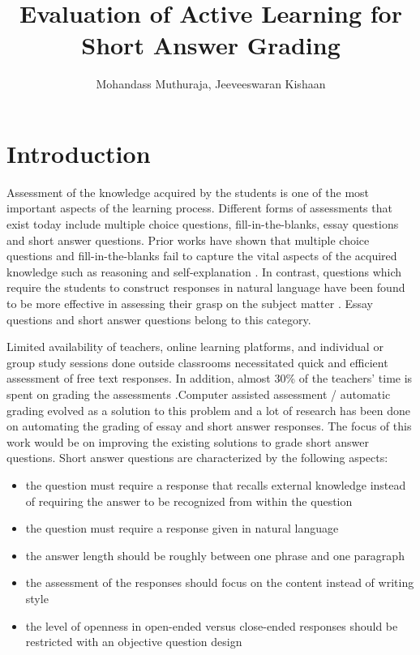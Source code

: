 \documentclass[rnd]{mas_proposal}
\title{Evaluation of Active Learning for Short Answer Grading}
\author{Mohandass Muthuraja, Jeeveeswaran Kishaan}
\begin{document}
\maketitle
\tableofcontents
\pagestyle{plain}
\chapter{Introduction}

\vspace{4mm}
 
Assessment of the knowledge acquired by the students is one of the most important aspects of the learning process. Different forms of assessments that exist today include multiple choice questions, fill-in-the-blanks, essay questions and short answer questions. Prior works have shown that multiple choice questions and fill-in-the-blanks fail to capture the vital aspects of the acquired knowledge such as reasoning and self-explanation \cite{Wang2008}. In contrast, questions which require the students to construct responses in natural language have been found to be more effective in assessing their grasp on the subject matter \cite{Roy2016a}. Essay questions and short answer questions belong to this category.  

\vspace{4mm}

Limited availability of teachers, online learning platforms, and individual or group study sessions done outside classrooms necessitated quick and efficient assessment of free text responses. In addition, almost 30\% of the teachers' time is spent on grading the assessments \cite{mason2002}.Computer assisted assessment / automatic grading evolved as a solution to this problem and a lot of research has been done on automating the grading of essay\cite{Higgins2004} and short answer responses\cite{Leacock2003, Pulman2005, Mohler2009}. The focus of this work would be on improving the existing solutions to grade short answer questions. Short answer questions are characterized by the following aspects\cite{Burrows2015}:

\begin{itemize}

\item the question must require a response that recalls external knowledge instead of requiring the answer to be recognized from within the question

\item the question must require a response given in natural language

\item the answer length should be roughly between one phrase and one paragraph

\item the assessment of the responses should focus on the content instead of writing style

\item the level of openness in open-ended versus close-ended responses should be restricted with an objective question design 

\end{itemize}
\end{document}
